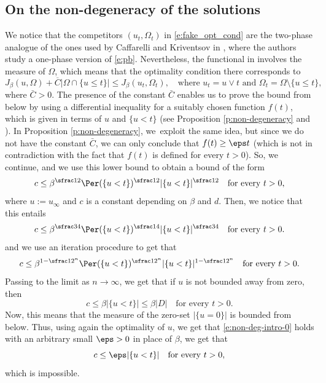 \subsection{On the non-degeneracy of the solutions}
We notice that the competitors $(u_t,\Omega_t)$ in \eqref{e:fake_opt_cond} are the two-phase analogue of the ones used by Caffarelli and Kriventsov in \cite{ck}, where the authors study a one-phase version of \eqref{e:pb}. Nevertheless, the functional in \cite{ck} involves the measure of $\Omega$, which means that the optimality condition there corresponds to
\begin{equation*}
J_\beta(u,\Omega)+\overline C|\Omega\cap\{u\le t\}|\le J_\beta(u_t,\Omega_t),\quad\text{where } u_t=u\vee t\text{ and } \Omega_t=\Omega\setminus \{u\le t\},
\end{equation*}
where $\bar C>0$. The presence of the constant $\bar C$ enables us to prove the bound from below by using a differential inequality for a suitably chosen function $f(t)$, which is given in terms of $u$ and $\{u<t\}$ (see Proposition \ref{p:non-degeneracy} and \cite[Th.\,3.2]{ck}). In Proposition \ref{p:non-degeneracy}, we~exploit the same idea, but since we do not have the constant $\bar C$, we can only conclude that $f(t)\ge \eps t$ (which is not in contradiction with the fact that $f(t)$ is defined for every $t>0$). So, we continue, and we use this lower bound to obtain a bound of the form
\begin{equation}\label{e:non-deg-intro-0}
c\le \beta^{\sfrac12}\Per(\{u<t\})^{\sfrac12}|\{u<t\}|^{\sfrac12}\quad\text{for every } t>0,
\end{equation}
where $u:=u_\infty$ and $c$ is a constant depending on $\beta$ and $d$. Then, we notice that this entails
\[c\le \beta^{\sfrac34}\Per(\{u<t\})^{\sfrac14}|\{u<t\}|^{\sfrac34}\quad\text{for every } t>0.\]
and we use an iteration procedure to get that
\[c\le \beta^{1-\sfrac1{2^n}}\Per(\{u<t\})^{\sfrac1{2^n}}|\{u<t\}|^{1-\sfrac1{2^n}}\quad\text{for every } t>0.\]
Passing to the limit as $n\to\infty$, we get that if $u$ is not bounded away from zero, then
\begin{equation}\label{e:non-deg-intro}
c\le \beta |\{u<t\}|\le\beta |D|\quad\text{for every } t>0.
\end{equation}
Now, this means that the measure of the zero-set $|\{u=0\}|$ is bounded from below. Thus, using again the optimality of $u$, we get that \eqref{e:non-deg-intro-0} holds with an arbitrary small $\eps>0$ in place of $\beta$, we get that
\begin{equation*}
c\le \eps |\{u<t\}|\quad\text{for every } t>0,
\end{equation*}
which is impossible.

